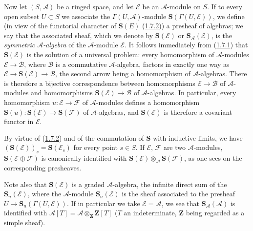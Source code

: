 \begin{env}[1.7.4]
\label{II.1.7.4}
Now let $(S,\mathcal{A})$ be a ringed space, and let $\mathcal{E}$ be an
$\mathcal{A}$-module on $S$. If to every open subset $U\subset S$ we
associate the $\Gamma(U,\mathcal{A})$-module
$\mathbf{S}(\Gamma(U,\mathcal{E}))$, we define (in view of the functorial
character of $\mathbf{S}(E)$ (\hyperref[II.1.7.2]{1.7.2})) a presheaf of
algebras; we say that the associated sheaf, which we denote by
$\mathbf{S}(\mathcal{E})$ or $\mathbf{S}_{\mathcal{A}}(\mathcal{E})$, is
the \emph{symmetric $\mathcal{A}$-algebra} of the $\mathcal{A}$-module
$\mathcal{E}$. It follows immediately from (\hyperref[II.1.7.1]{1.7.1})
that $\mathbf{S}(\mathcal{E})$ is the solution of a universal problem:
every homomorphism of $\mathcal{A}$-modules
$\mathcal{E}\to\mathcal{B}$, where $\mathcal{B}$ is a commutative
$\mathcal{A}$-algebra, factors in exactly one way as
$\mathcal{E}\to\mathbf{S}(\mathcal{E})\to\mathcal{B}$, the second arrow
being a homomorphism of $\mathcal{A}$-algebras. There is therefore a
bijective correspondence between homomorphisms $\mathcal{E}\to\mathcal{B}$
of $\mathcal{A}$-modules and homomorphisms
$\mathbf{S}(\mathcal{E})\to\mathcal{B}$ of $\mathcal{A}$-algebras. In
particular, every homomorphism $u:\mathcal{E}\to\mathcal{F}$ of
$\mathcal{A}$-modules defines a homomorphism
$\mathbf{S}(u):\mathbf{S}(\mathcal{E})\to\mathbf{S}(\mathcal{F})$ of
$\mathcal{A}$-algebras, and $\mathbf{S}(\mathcal{E})$ is therefore a
covariant functor in $\mathcal{E}$.

By virtue of (\hyperref[II.1.7.2]{1.7.2}) and of the commutation of
$\mathbf{S}$ with inductive limits, we have
$(\mathbf{S}(\mathcal{E}))_s=\mathbf{S}(\mathcal{E}_s)$ for every point
$s\in S$. If $\mathcal{E}$, $\mathcal{F}$ are two $\mathcal{A}$-modules,
$\mathbf{S}(\mathcal{E}\oplus\mathcal{F})$ is canonically identified with
$\mathbf{S}(\mathcal{E})\otimes_{\mathcal{A}}\mathbf{S}(\mathcal{F})$,
as one sees on the corresponding presheaves.

Note also that $\mathbf{S}(\mathcal{E})$ is a graded $\mathcal{A}$-algebra,
the infinite direct sum of the $\mathbf{S}_n(\mathcal{E})$, where the
$\mathcal{A}$-module $\mathbf{S}_n(\mathcal{E})$ is the sheaf associated to
the presheaf $U\to\mathbf{S}_n(\Gamma(U,\mathcal{E}))$. If in
particular we take $\mathcal{E}=\mathcal{A}$, we see that
$\mathbf{S}_{\mathcal{A}}(\mathcal{A})$ is identified with
$\mathcal{A}[T]=\mathcal{A}\otimes_{\mathbf{Z}}\mathbf{Z}[T]$
($T$ an indeterminate, $\mathbf{Z}$ being regarded as a simple sheaf).
\end{env}

